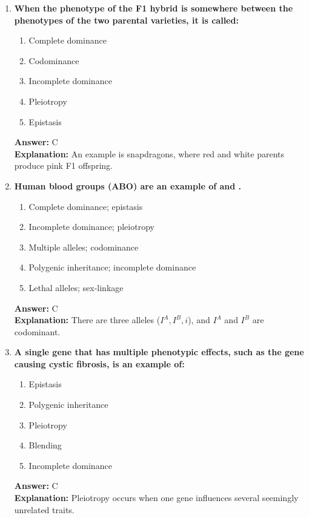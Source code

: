 \documentclass[11pt, a4paper]{article}
\begin{document}
\begin{enumerate}[leftmargin=*, label=\arabic*.]
\item \textbf{When the phenotype of the F1 hybrid is somewhere between the phenotypes of the two parental varieties, it is called:}
\begin{enumerate}[label=\Alph*.]
\item Complete dominance
\item Codominance
\item Incomplete dominance
\item Pleiotropy
\item Epistasis
\end{enumerate}
\textbf{Answer:} C \\
\textbf{Explanation:} An example is snapdragons, where red and white parents produce pink F1 offspring.

\item \textbf{Human blood groups (ABO) are an example of \underline{\hspace{1cm}} and \underline{\hspace{1cm}}.}
\begin{enumerate}[label=\Alph*.]
\item Complete dominance; epistasis
\item Incomplete dominance; pleiotropy
\item Multiple alleles; codominance
\item Polygenic inheritance; incomplete dominance
\item Lethal alleles; sex-linkage
\end{enumerate}
\textbf{Answer:} C \\
\textbf{Explanation:} There are three alleles ($I^A, I^B, i$), and $I^A$ and $I^B$ are codominant.

\item \textbf{A single gene that has multiple phenotypic effects, such as the gene causing cystic fibrosis, is an example of:}
\begin{enumerate}[label=\Alph*.]
\item Epistasis
\item Polygenic inheritance
\item Pleiotropy
\item Blending
\item Incomplete dominance
\end{enumerate}
\textbf{Answer:} C \\
\textbf{Explanation:} Pleiotropy occurs when one gene influences several seemingly unrelated traits.


\end{enumerate}
\end{document}
